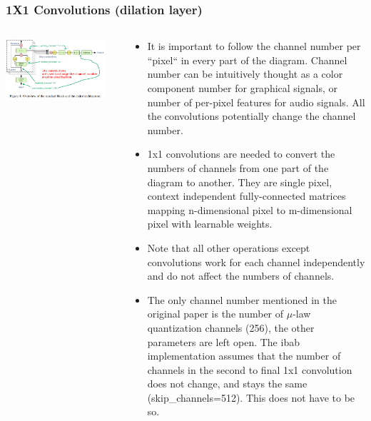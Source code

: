 \documentclass[8pt]{beamer}
\begin{document}
\begin{frame}[fragile]
\frametitle{1X1 Convolutions (dilation layer)}
\begin{columns}
\begin{column}{0.5\textwidth}
 
\includegraphics[width=0.9\textwidth]{./dl3_images/1x1_convolutions_1.png}

\end{column}
\begin{column}{0.5\textwidth}
{\tiny
\begin{itemize}
 \item It is important to follow the channel number per ``pixel`` in every part of the diagram. Channel number can be intuitively thought as a color component number for graphical
signals, or number of per-pixel features for audio signals. All the convolutions potentially change the channel number.
 \item 1x1 convolutions are needed to convert the numbers of channels from one part of the diagram to another. They are single pixel, context independent fully-connected matrices mapping
n-dimensional pixel to m-dimensional pixel with learnable weights.
 \item Note that all other operations except convolutions work for each channel independently and do not affect the numbers of channels.
 \item The only channel number mentioned in the original paper is the number of $ \mu $-law quantization channels (256), the other parameters are left open.
The ibab implementation assumes that the number of channels in the second to final 1x1 convolution does not change, and stays the same (skip\_channels=512). This does not have to be so.
\end{itemize}
}
\end{column}
\end{columns} 
 
\end{frame}
\end{document}
